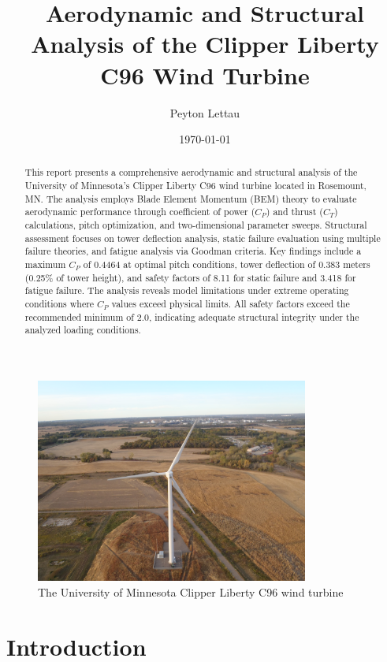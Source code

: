 \documentclass[11pt]{article}
\title{Aerodynamic and Structural Analysis of the Clipper Liberty C96 Wind Turbine}
\author{Peyton Lettau}
\date{\today}
\begin{document}
\maketitle

\begin{abstract}
This report presents a comprehensive aerodynamic and structural analysis of the University of Minnesota's Clipper Liberty C96 wind turbine located in Rosemount, MN. The analysis employs Blade Element Momentum (BEM) theory to evaluate aerodynamic performance through coefficient of power ($C_P$) and thrust ($C_T$) calculations, pitch optimization, and two-dimensional parameter sweeps. Structural assessment focuses on tower deflection analysis, static failure evaluation using multiple failure theories, and fatigue analysis via Goodman criteria. Key findings include a maximum $C_P$ of 0.4464 at optimal pitch conditions, tower deflection of 0.383 meters (0.25\% of tower height), and safety factors of 8.11 for static failure and 3.418 for fatigue failure. The analysis reveals model limitations under extreme operating conditions where $C_P$ values exceed physical limits. All safety factors exceed the recommended minimum of 2.0, indicating adequate structural integrity under the analyzed loading conditions.
\end{abstract}

\begin{figure}[H]
  \centering
  \includegraphics[width=0.8\textwidth]{../../PNGS/UMN turbine.jpg}
  \caption{The University of Minnesota Clipper Liberty C96 wind turbine}
  \label{fig:umn_turbine_photo}
\end{figure}

\tableofcontents
\newpage

\section{Introduction}
\end{document}

